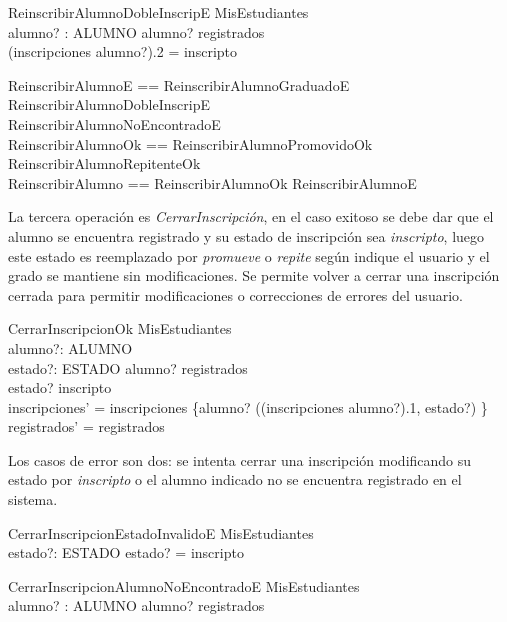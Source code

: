 \documentclass{article}
\begin{document}
\begin{schema}{ReinscribirAlumnoDobleInscripE}
    \Xi MisEstudiantes \\
    alumno? : ALUMNO
    \where
    alumno? \in registrados \\
    (inscripciones \; alumno?).2 = inscripto
\end{schema}

\begin{zed}
    ReinscribirAlumnoE == ReinscribirAlumnoGraduadoE \lor ReinscribirAlumnoDobleInscripE \\
        \lor ReinscribirAlumnoNoEncontradoE \\
    ReinscribirAlumnoOk == ReinscribirAlumnoPromovidoOk \lor ReinscribirAlumnoRepitenteOk \\
    ReinscribirAlumno == ReinscribirAlumnoOk \lor ReinscribirAlumnoE
\end{zed}

La tercera operación es \emph{CerrarInscripción}, en el caso exitoso se debe dar que el alumno se encuentra registrado y su estado de inscripción sea \emph{inscripto}, luego este estado es reemplazado por \emph{promueve} o \emph{repite} según indique el usuario y el grado se mantiene sin modificaciones. Se permite volver a cerrar una inscripción cerrada para permitir modificaciones o correcciones de errores del usuario.

\begin{schema}{CerrarInscripcionOk}
    \Delta MisEstudiantes \\
    alumno?: ALUMNO \\
    estado?: ESTADO
    \where
    alumno? \in registrados \\
    estado? \neq inscripto \\
    inscripciones' = inscripciones \oplus \{alumno? \mapsto ((inscripciones \; alumno?).1, estado?) \} \\
    registrados' = registrados
\end{schema}

Los casos de error son dos: se intenta cerrar una inscripción modificando su estado por \emph{inscripto} o el alumno indicado no se encuentra registrado en el sistema.

\begin{schema}{CerrarInscripcionEstadoInvalidoE}
    \Xi MisEstudiantes \\
    estado?: ESTADO
    \where
    estado? = inscripto
\end{schema}

\begin{schema}{CerrarInscripcionAlumnoNoEncontradoE}
    \Xi MisEstudiantes \\
    alumno? : ALUMNO
    \where
    alumno? \notin registrados
\end{schema}
\end{document}
